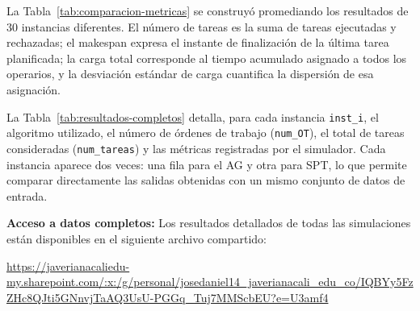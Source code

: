 La Tabla~\ref{tab:comparacion-metricas} se construyó promediando los resultados de 30 instancias diferentes. El número de tareas es la suma de tareas ejecutadas y rechazadas; el makespan expresa el instante de finalización de la última tarea planificada; la carga total corresponde al tiempo acumulado asignado a todos los operarios, y la desviación estándar de carga cuantifica la dispersión de esa asignación.

La Tabla~\ref{tab:resultados-completos} detalla, para cada instancia \texttt{inst\_i}, el algoritmo utilizado, el número de órdenes de trabajo (\texttt{num\_OT}), el total de tareas consideradas (\texttt{num\_tareas}) y las métricas registradas por el simulador. Cada instancia aparece dos veces: una fila para el AG y otra para SPT, lo que permite comparar directamente las salidas obtenidas con un mismo conjunto de datos de entrada.

\noindent
\textbf{Acceso a datos completos:} Los resultados detallados de todas las simulaciones están disponibles en el siguiente archivo compartido:

\begin{center}
\url{https://javerianacaliedu-my.sharepoint.com/:x:/g/personal/josedaniel14_javerianacali_edu_co/IQBYy5FzZHc8QJti5GNnvjTaAQ3UsU-PGGq_Tuj7MMScbEU?e=U3amf4}
\end{center}
